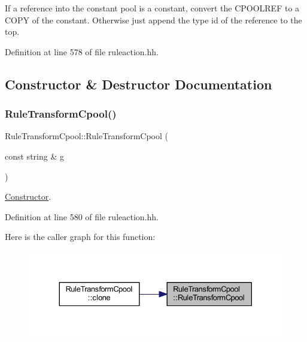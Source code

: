 If a reference into the constant pool is a constant, convert the C\+P\+O\+O\+L\+R\+EF to a C\+O\+PY of the constant. Otherwise just append the type id of the reference to the top. 

Definition at line 578 of file ruleaction.\+hh.



\subsection{Constructor \& Destructor Documentation}
\mbox{\label{class_rule_transform_cpool_a6180ea4f84c2837b508c13584cd9040a}} 
\subsubsection{\texorpdfstring{RuleTransformCpool()}{RuleTransformCpool()}}
{\footnotesize\ttfamily Rule\+Transform\+Cpool\+::\+Rule\+Transform\+Cpool (\begin{DoxyParamCaption}\item[{const string \&}]{g }\end{DoxyParamCaption})\hspace{0.3cm}{\ttfamily [inline]}}



\mbox{\hyperlink{class_constructor}{Constructor}}. 



Definition at line 580 of file ruleaction.\+hh.

Here is the caller graph for this function\+:
\nopagebreak
\begin{figure}[H]
\begin{center}
\leavevmode
\includegraphics[width=330pt]{class_rule_transform_cpool_a6180ea4f84c2837b508c13584cd9040a_icgraph}
\end{center}
\end{figure}


